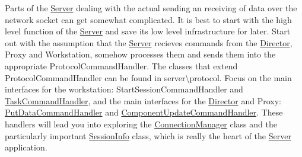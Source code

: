 Parts of the \hyperlink{class_server}{Server} dealing with the actual sending an receiving of data over the network socket can get somewhat complicated. It is best to start with the high level function of the \hyperlink{class_server}{Server} and save its low level infrastructure for later. Start out with the assumption that the \hyperlink{class_server}{Server} recieves commands from the \hyperlink{class_director}{Director}, Proxy and Workstation, somehow processes them and sends them into the appropriate Protocol\-Command\-Handler. The classes that extend Protocol\-Command\-Handler can be found in server\textbackslash{}protocol. Focus on the main interfaces for the workstation\-: Start\-Session\-Command\-Handler and \hyperlink{struct_task_command_handler}{Task\-Command\-Handler}, and the main interfaces for the \hyperlink{class_director}{Director} and Proxy\-: \hyperlink{struct_put_data_command_handler}{Put\-Data\-Command\-Handler} and \hyperlink{struct_component_update_command_handler}{Component\-Update\-Command\-Handler}. These handlers will lead you into exploring the \hyperlink{class_connection_manager}{Connection\-Manager} class and the particularly important \hyperlink{class_session_info}{Session\-Info} class, which is really the heart of the \hyperlink{class_server}{Server} application.

